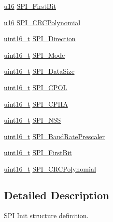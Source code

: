 \begin{DoxyCompactItemize}
\hyperlink{agilefox_2library_2inc_2stm32f10x__type_8h_a9e6c91d77e24643b888dbd1a1a590054}{u16} \hyperlink{struct_s_p_i___init_type_def_ae6237c6504f3876249b4ee06f51a9847}{S\+P\+I\+\_\+\+First\+Bit}
\item 
\hyperlink{agilefox_2library_2inc_2stm32f10x__type_8h_a9e6c91d77e24643b888dbd1a1a590054}{u16} \hyperlink{struct_s_p_i___init_type_def_a0384b156f5b6aaf8a5ddd672df7de976}{S\+P\+I\+\_\+\+C\+R\+C\+Polynomial}
\item 
\hyperlink{_p_e___types_8h_a1f1825b69244eb3ad2c7165ddc99c956}{uint16\+\_\+t} \hyperlink{struct_s_p_i___init_type_def_a8cf0fefa76b9238a41997db14eac62a9}{S\+P\+I\+\_\+\+Direction}
\item 
\hyperlink{_p_e___types_8h_a1f1825b69244eb3ad2c7165ddc99c956}{uint16\+\_\+t} \hyperlink{struct_s_p_i___init_type_def_a578435d3b3a17baa5d5ff87447aa697f}{S\+P\+I\+\_\+\+Mode}
\item 
\hyperlink{_p_e___types_8h_a1f1825b69244eb3ad2c7165ddc99c956}{uint16\+\_\+t} \hyperlink{struct_s_p_i___init_type_def_a0e63950d46a6483f9b7048b8c97800b8}{S\+P\+I\+\_\+\+Data\+Size}
\item 
\hyperlink{_p_e___types_8h_a1f1825b69244eb3ad2c7165ddc99c956}{uint16\+\_\+t} \hyperlink{struct_s_p_i___init_type_def_a1fe46794d91fd950e06da06b0e488997}{S\+P\+I\+\_\+\+C\+P\+OL}
\item 
\hyperlink{_p_e___types_8h_a1f1825b69244eb3ad2c7165ddc99c956}{uint16\+\_\+t} \hyperlink{struct_s_p_i___init_type_def_acdaac9259c45f137e804f90122edb129}{S\+P\+I\+\_\+\+C\+P\+HA}
\item 
\hyperlink{_p_e___types_8h_a1f1825b69244eb3ad2c7165ddc99c956}{uint16\+\_\+t} \hyperlink{struct_s_p_i___init_type_def_a6c1ea4b5e3d147b74799efa42e3903c6}{S\+P\+I\+\_\+\+N\+SS}
\item 
\hyperlink{_p_e___types_8h_a1f1825b69244eb3ad2c7165ddc99c956}{uint16\+\_\+t} \hyperlink{struct_s_p_i___init_type_def_adfcf6178b6a117643111c13403f32e71}{S\+P\+I\+\_\+\+Baud\+Rate\+Prescaler}
\item 
\hyperlink{_p_e___types_8h_a1f1825b69244eb3ad2c7165ddc99c956}{uint16\+\_\+t} \hyperlink{struct_s_p_i___init_type_def_ace7ca292c290953f8a6ae86f79949f5b}{S\+P\+I\+\_\+\+First\+Bit}
\item 
\hyperlink{_p_e___types_8h_a1f1825b69244eb3ad2c7165ddc99c956}{uint16\+\_\+t} \hyperlink{struct_s_p_i___init_type_def_aee6460416ade6c4016aac2bd64cae0eb}{S\+P\+I\+\_\+\+C\+R\+C\+Polynomial}
\end{DoxyCompactItemize}


\subsection{Detailed Description}
S\+PI Init structure definition. 

